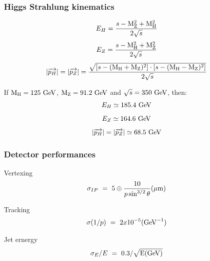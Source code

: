 \documentclass{beamer}
\begin{document}

  \begin{frame}[plain]
    \frametitle{Higgs Strahlung kinematics}

    \[ E_H = \frac{s - \rm{M}_Z^2 + \rm{M}_H^2}{2\sqrt{s}} \]
    \[ E_Z = \frac{s - \rm{M}_H^2 + \rm{M}_Z^2}{2\sqrt{s}} \]
    \[ | \overrightarrow{p_H} | = | \overrightarrow{p_Z} | = \frac{\sqrt{\left[ s - (\rm{M}_H + \rm{M}_Z)^2 \right] \cdot \left[s - (\rm{M}_H - \rm{M}_Z)^2 \right]}}{2\sqrt{s}} \]

    If $\rm{M}_H = 125~\rm{GeV}$, $\rm{M}_Z = 91.2~\rm{GeV}$ and $\sqrt{s} = 350~\rm{GeV}$, then:
    \[ E_H \simeq 185.4~\rm{GeV} \]
    \[ E_Z \simeq 164.6~\rm{GeV} \]
    \[  | \overrightarrow{p_H} | = | \overrightarrow{p_Z} | \simeq 68.5~\rm{GeV}\]

  \end{frame}

  \begin{frame}[plain]
    \frametitle{Detector performances}

    \begin{block}{Vertexing}
      \[ \sigma_{IP} \ = \ 5 \oplus \frac{10}{p\sin^{3/2}\theta} (\mu\rm{m})\]
    \end{block}

    \begin{block}{Tracking}
      \[ \sigma (1/p) \ = \ 2x10^{-5} (\rm{GeV}^{-1})\]
    \end{block}
      
    \begin{block}{Jet ernergy}
      \[\sigma_E / E \ = \ 0.3/\sqrt{\rm{E(GeV)}}\]
    \end{block}

  \end{frame}
\end{document}

